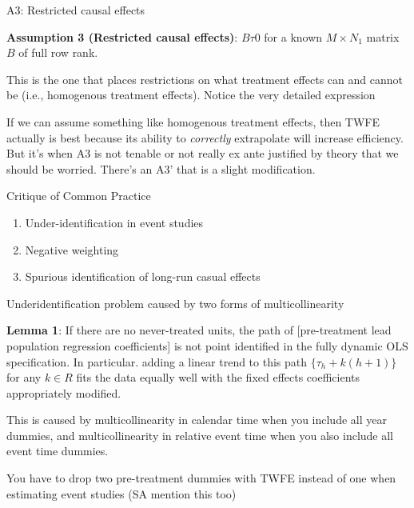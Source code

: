 \documentclass{beamer}
\begin{document}
\begin{frame}{A3: Restricted causal effects}

\textbf{Assumption 3 (Restricted causal effects)}: $B\tau0$ for a known $M \times N_1$ matrix $B$ of full row rank. 

This is the one that places restrictions on what treatment effects can and cannot be (i.e., homogenous treatment effects). Notice the very detailed expression

\bigskip

If we can assume something like homogenous treatment effects, then TWFE actually is best because its ability to \emph{correctly} extrapolate will increase efficiency. But it's when A3 is not tenable or not really ex ante justified by theory that we should be worried. There's an A3' that is a slight modification. 

\end{frame}


\begin{frame}{Critique of Common Practice}

\begin{enumerate}
\item Under-identification in event studies
\item Negative weighting
\item Spurious identification of long-run casual effects
\end{enumerate}

\end{frame}

\begin{frame}{Underidentification problem caused by two forms of multicollinearity}


\textbf{Lemma 1}: If there are no never-treated units, the path of [pre-treatment lead population regression coefficients] is not point identified in the fully dynamic OLS specification.  In particular. adding a linear trend to this path $\{\tau_h + k(h+1) \}$ for any $k \in R$ fits the data equally well with the fixed effects coefficients appropriately modified.

\bigskip

This is caused by multicollinearity in calendar time when you include all year dummies, and multicollinearity in relative event time when you also include all event time dummies.  

\bigskip

You have to drop two pre-treatment dummies with TWFE instead of one when estimating event studies (SA mention this too)

\end{frame}
\end{document}
